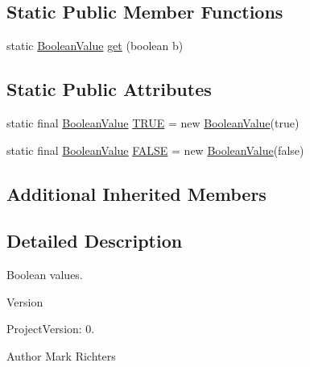 \subsection*{Static Public Member Functions}
\begin{DoxyCompactItemize}
\item 
static \hyperlink{classorg_1_1tzi_1_1use_1_1uml_1_1ocl_1_1value_1_1_boolean_value}{Boolean\-Value} \hyperlink{classorg_1_1tzi_1_1use_1_1uml_1_1ocl_1_1value_1_1_boolean_value_af147f0c0f62e9d9c3c2ad99834a3302a}{get} (boolean b)
\end{DoxyCompactItemize}
\subsection*{Static Public Attributes}
\begin{DoxyCompactItemize}
\item 
static final \hyperlink{classorg_1_1tzi_1_1use_1_1uml_1_1ocl_1_1value_1_1_boolean_value}{Boolean\-Value} \hyperlink{classorg_1_1tzi_1_1use_1_1uml_1_1ocl_1_1value_1_1_boolean_value_af6f04be4c101d8fbd7e82d27ac69ebba}{T\-R\-U\-E} = new \hyperlink{classorg_1_1tzi_1_1use_1_1uml_1_1ocl_1_1value_1_1_boolean_value}{Boolean\-Value}(true)
\item 
static final \hyperlink{classorg_1_1tzi_1_1use_1_1uml_1_1ocl_1_1value_1_1_boolean_value}{Boolean\-Value} \hyperlink{classorg_1_1tzi_1_1use_1_1uml_1_1ocl_1_1value_1_1_boolean_value_aa0f111e8172f1b3c6c9ba327a1e46c15}{F\-A\-L\-S\-E} = new \hyperlink{classorg_1_1tzi_1_1use_1_1uml_1_1ocl_1_1value_1_1_boolean_value}{Boolean\-Value}(false)
\end{DoxyCompactItemize}
\subsection*{Additional Inherited Members}


\subsection{Detailed Description}
Boolean values.

\begin{DoxyVersion}{Version}

\end{DoxyVersion}
\begin{DoxyParagraph}{Project\-Version\-:}
0. 
\end{DoxyParagraph}
\begin{DoxyAuthor}{Author}
Mark Richters 
\end{DoxyAuthor}


